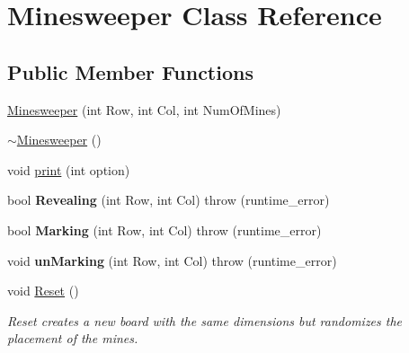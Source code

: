 \hypertarget{classMinesweeper}{}\section{Minesweeper Class Reference}
\label{classMinesweeper}
\subsection*{Public Member Functions}
\begin{DoxyCompactItemize}
\item 
\hyperlink{classMinesweeper_a9cb58f108f5f65317c5f7d60ead4e7ec}{Minesweeper} (int Row, int Col, int Num\+Of\+Mines)
\item 
\hyperlink{classMinesweeper_a79c2fcb860d486113e1b557e34dbb67d}{$\sim$\+Minesweeper} ()
\item 
void \hyperlink{classMinesweeper_a8abe207bf94f14d33c10dc88410e6f8c}{print} (int option)
\item 
\mbox{\label{classMinesweeper_a4da8ec9ff58f3e663eed64ab70d523be}} 
bool {\bfseries Revealing} (int Row, int Col)  throw (runtime\+\_\+error)
\item 
\mbox{\label{classMinesweeper_a8ac0c88846a50058ac722e4e9df5afaa}} 
bool {\bfseries Marking} (int Row, int Col)  throw (runtime\+\_\+error)
\item 
\mbox{\label{classMinesweeper_ad15ef447b75d2e8775eee43c493d29f4}} 
void {\bfseries un\+Marking} (int Row, int Col)  throw (runtime\+\_\+error)
\item 
void \hyperlink{classMinesweeper_a7bb8b53ca69cd4959e5123a07047702f}{Reset} ()
\begin{DoxyCompactList}\small\item\em Reset creates a new board with the same dimensions but randomizes the placement of the mines. \end{DoxyCompactList}\end{DoxyCompactItemize}
